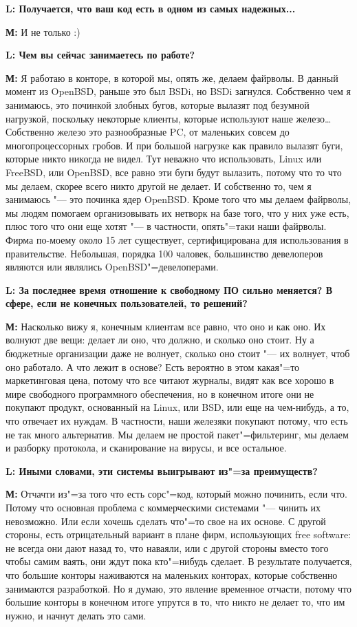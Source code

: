 \documentclass[10pt, a5paper]{article}
\begin{document}
{\noindent \bf L: Получается, что ваш код есть в одном из самых надежных...}

{\noindent \bf М:} И не только :)

{\noindent \bf L: Чем вы сейчас занимаетесь по работе?}

{\noindent \bf М:} Я работаю в конторе, в которой мы, опять же, делаем файрволы. В данный момент из OpenBSD, раньше это был BSDi, но BSDi загнулся. Собственно чем я занимаюсь, это починкой злобных бугов, которые вылазят под безумной нагрузкой, поскольку некоторые клиенты, которые используют наше железо\ldots Собственно железо это разнообразные PC, от маленьких совсем до многопроцессорных гробов. И при большой нагрузке как правило вылазят буги, которые никто никогда не видел. Тут неважно что использовать, Linux или FreeBSD, или OpenBSD, все равно эти буги будут вылазить, потому что то что мы делаем, скорее всего никто другой не делает. И собственно то, чем я занимаюсь "--- это починка ядер OpenBSD.  Кроме того что мы делаем файрволы, мы людям помогаем организовывать их нетворк на базе того, что у них уже есть, плюс того что они еще хотят "--- в частности, опять"=таки наши файрволы. Фирма по-моему около 15 лет существует, сертифицирована для использования в правительстве. Небольшая, порядка 100 чаловек, большинство девелоперов являются или являлись OpenBSD"=девелоперами. 

{\noindent \bf L: За последнее время отношение к свободному ПО сильно меняется? В сфере, если не конечных пользователей, то решений?}

{\noindent \bf М:} Насколько вижу я, конечным клиентам все равно, что оно и как оно. Их волнуют две вещи: делает ли оно, что должно, и сколько оно стоит. Ну а бюджетные организации даже не волнует, сколько оно стоит "--- их волнует, чтоб оно работало. А что лежит в основе? Есть вероятно в этом какая"=то маркетинговая цена, потому что все читают журналы, видят как все хорошо в мире свободного программного обеспечения, но в конечном итоге они не покупают продукт, основанный на Linux, или BSD, или еще на чем-нибудь, а то, что отвечает их нуждам. В частности, наши железяки покупают потому, что есть не так много альтернатив. Мы делаем не простой пакет"=фильтеринг, мы делаем и разборку протокола, и сканирование на вирусы, и все остальное.

{\noindent \bf L: Иными словами, эти системы выигрывают из"=за преимуществ?}

{\noindent \bf М:} Отчачти из"=за того что есть сорс"=код, который можно починить, если что. Потому что основная проблема с  коммерческими системами "--- чинить их невозможно. Или если хочешь сделать что"=то свое на их основе. С другой стороны, есть отрицательный вариант в плане фирм, использующих free software: не всегда они дают назад то, что наваяли, или с другой стороны вместо того чтобы самим ваять, они ждут пока кто"=нибудь сделает. В результате получается, что большие конторы наживаются на маленьких конторах, которые собственно занимаются разработкой. Но я думаю, это явление временное отчасти, потому что большие конторы в конечном итоге упрутся в то, что никто не делает то, что им нужно, и начнут делать это сами.
\end{document}
